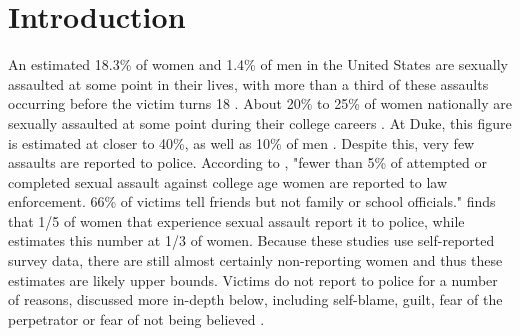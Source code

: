 \documentclass[AER,draftmode]{AEA}
\begin{document}

\clearpage
\section{Introduction}

An estimated 18.3\% of women and 1.4\% of men in the United States are sexually assaulted at some point in their lives, with more than a third of these assaults occurring before the victim turns 18  \cite{black_national_2011}. About 20\% to 25\% of women nationally are sexually assaulted at some point during their college careers \cite{fisher_sexual_2000}. At Duke, this figure is estimated at closer to 40\%, as well as 10\% of men \cite{fox_university_2017}. Despite this, very few assaults are reported to police. According to , "fewer than 5\% of attempted or completed sexual assault against college age women are reported to law enforcement. 66\% of victims tell friends but not family or school officials."  finds that 1/5 of women that experience sexual assault report it to police, while  estimates this number at 1/3 of women. Because these studies use self-reported survey data, there are still almost certainly non-reporting women and thus these estimates are likely upper bounds. Victims do not report to police for a number of reasons, discussed more in-depth below, including self-blame, guilt, fear of the perpetrator or fear of not being believed \cite{du_mont_role_2003}.
\end{document}
